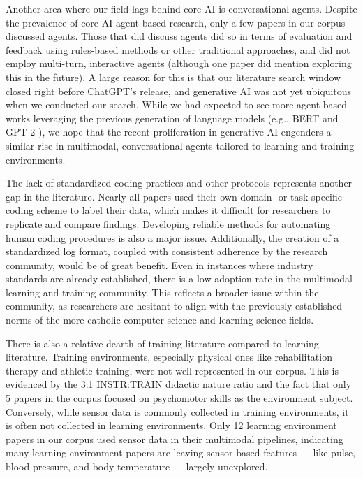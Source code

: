 \documentclass[manuscript,screen,review]{acmart}
\begin{document}
Another area where our field lags behind core AI is conversational agents. Despite the prevalence of core AI agent-based research, only a few papers in our corpus discussed agents. Those that did discuss agents did so in terms of evaluation and feedback using rules-based methods or other traditional approaches, and did not employ multi-turn, interactive agents (although one paper \cite{3093310941} did mention exploring this in the future). A large reason for this is that our literature search window closed right before ChatGPT's release, and generative AI was not yet ubiquitous when we conducted our search. While we had expected to see more agent-based works leveraging the previous generation of language models (e.g., BERT \cite{devlin2018bert} and GPT-2 \cite{radford2019language}), we hope that the recent proliferation in generative AI engenders a similar rise in multimodal, conversational agents tailored to learning and training environments.

The lack of standardized coding practices and other protocols represents another gap in the literature. Nearly all papers used their own domain- or task-specific coding scheme to label their data, which makes it difficult for researchers to replicate and compare findings. Developing reliable methods for automating human coding procedures is also a major issue. Additionally, the creation of a standardized log format, coupled with consistent adherence by the research community, would be of great benefit. Even in instances where industry standards are already established, there is a low adoption rate in the multimodal learning and training community. This reflects a broader issue within the community, as researchers are hesitant to align with the previously established norms of the more catholic computer science and learning science fields.  

There is also a relative dearth of training literature compared to learning literature. Training environments, especially physical ones like rehabilitation therapy and athletic training, were not well-represented in our corpus. This is evidenced by the 3:1 INSTR:TRAIN didactic nature ratio and the fact that only 5 papers in the corpus focused on psychomotor skills as the environment subject. Conversely, while sensor data is commonly collected in training environments, it is often not collected in learning environments. Only 12 learning environment papers in our corpus used sensor data in their multimodal pipelines, indicating many learning environment papers are leaving sensor-based features --- like pulse, blood pressure, and body temperature --- largely unexplored. 
\end{document}
